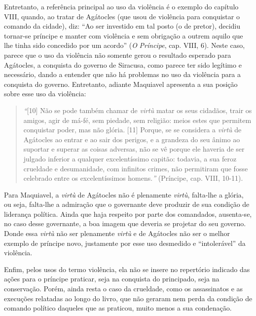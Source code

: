 Entretanto, a referência principal ao uso da violência é o exemplo do
capítulo VIII, quando, ao tratar de Agátocles (que usou de violência
para conquistar o comando da cidade), diz: ``Ao ser investido em tal
posto (o de pretor), decidiu tornar-se príncipe e manter com violência e
sem obrigação a outrem aquilo que lhe tinha sido concedido por um
acordo'' (\emph{O} \emph{Príncipe}, cap. VIII, 6). Neste caso, parece
que o uso da violência não somente gerou o resultado esperado para
Agátocles, a conquista do governo de Siracusa, como parece ter sido
legítimo e necessário, dando a entender que não há problemas no uso da
violência para a conquista do governo. Entretanto, adiante Maquiavel
apresenta a sua posição sobre esse uso da violência:

\begin{quote}
\emph{``}{[}10{]} Não se pode também chamar de \emph{virtù} matar os
seus cidadãos, trair os amigos, agir de má-fé, sem piedade, sem
religião: meios estes que permitem conquistar poder, mas não glória.
{[}11{]} Porque, se se considera a \emph{virtù} de Agátocles ao entrar e
ao sair dos perigos, e a grandeza do seu ânimo ao suportar e superar as
coisas adversas, não se vê porque ele haveria de ser julgado inferior a
qualquer excelentíssimo capitão: todavia, a sua feroz crueldade e
desumanidade, com infinitos crimes, não permitiram que fosse celebrado
entre os excelentíssimos homens.\emph{''} (Príncipe, cap. VIII, 10-11).
\end{quote}

Para Maquiavel, a \emph{virtù} de Agátocles não é plenamente
\emph{virtù}, falta-lhe a glória, ou seja, falta-lhe a admiração que o
governante deve produzir de sua condição de liderança política. Ainda
que haja respeito por parte dos comandados, ausenta-se, no caso desse
governante, a boa imagem que deveria se projetar do seu governo. Donde
essa \emph{virtù} não ser plenamente \emph{virtù} e de Agátocles não ser
o melhor exemplo de príncipe novo, justamente por esse uso desmedido e
``intolerável'' da violência.

Enfim, pelos usos do termo violência, ela não se insere no repertório
indicado das ações para o príncipe praticar, seja na conquista do
principado, seja na conservação. Porém, ainda resta o caso da crueldade,
como os assassinatos e as execuções relatadas ao longo do livro, que não
geraram nem perda da condição de comando político daqueles que as
praticou, muito menos a sua condenação.

